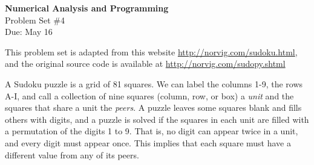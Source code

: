 \documentclass[12pt]{article}
\begin{document}
\begin{center}
\Large
\textbf{Numerical Analysis and Programming}\\
\large
Problem Set \#4\\
Due: May 16
\end{center}

This problem set is adapted from this website \url{http://norvig.com/sudoku.html}, and the original source code is available at \url{http://norvig.com/sudopy.shtml}

A Sudoku puzzle is a grid of 81 squares. We can label the columns 1-9, the rows A-I, and call a collection of nine squares (column, row, or box) a \textit{unit} and the squares that share a unit the \textit{peers}. A puzzle leaves some squares blank and fills others with digits, and
a puzzle is solved if the squares in each unit are filled with a permutation of the digits 1 to 9.
That is, no digit can appear twice in a unit, and every digit must appear once. This implies that each square must have a different value from any of its peers. 
\end{document}
